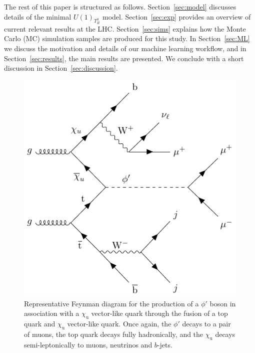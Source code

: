 The rest of this paper is structured as follows. Section~\ref{sec:model} discusses details of the minimal  $U(1)_{T_R^3}$ model. Section~\ref{sec:exp} provides an overview of current relevant results at the LHC. Section~\ref{sec:sims} explains how the Monte
Carlo (MC) simulation samples are produced for this study. In Section~\ref{sec:ML} we discuss the motivation and details of our machine learning workflow, and in Section~\ref{sec:results}, the main results are presented. We conclude with a short discussion in Section~\ref{sec:discussion}.
\begin{figure}
    \centering
    \includegraphics[width=0.75\linewidth]{Images/signal_qqfusion.pdf}
    \caption{Representative Feynman diagram for the production of a $\phi'$ boson in association with a $\chi_\mathrm{u}$ vector-like quark through the fusion of a top quark and $\chi_\mathrm{u}$ vector-like quark. Once again, the $\phi'$ decays to a pair of muons, the top quark decays fully hadronically, and the $\chi_\mathrm{u}$ decays semi-leptonically to muons, neutrinos and $b$-jets.\label{fig:qqfusion}}
\end{figure}

